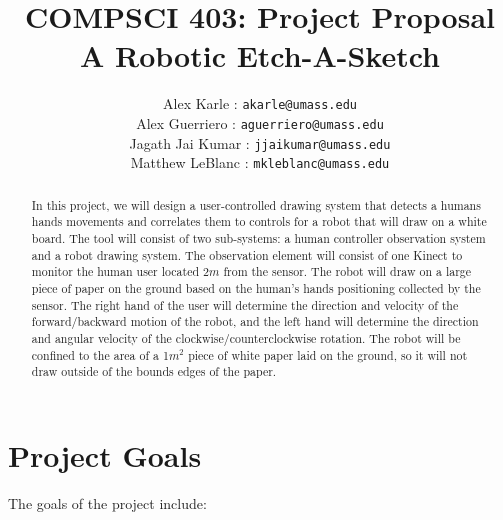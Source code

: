 \documentclass[a4paper]{article}
\title{
COMPSCI 403: Project Proposal \\ 
A Robotic Etch-A-Sketch
}
\author{
Alex Karle : \texttt{akarle@umass.edu}  \\ 
Alex Guerriero : \texttt{aguerriero@umass.edu}  \\ 
Jagath Jai Kumar : \texttt{jjaikumar@umass.edu} \\ 
Matthew LeBlanc : \texttt{mkleblanc@umass.edu}
}
\begin{document}
\maketitle

\begin{abstract}
In this project, we will design a user-controlled drawing system that detects a humans hands movements and correlates them to controls for a robot that will draw on a white board. The tool will consist of two sub-systems: a human controller observation system and a robot drawing system. The observation element will consist of one Kinect to monitor the human user located 2$m$ from the sensor. The robot will draw on a large piece of paper on the ground based on the human's hands positioning collected by the sensor. The right hand of the user will determine the direction and velocity of the forward/backward motion of the robot, and the left hand will determine the direction and angular velocity of the clockwise/counterclockwise rotation. The robot will be confined to the area of a 1$m^2$ piece of white paper laid on the ground, so it will not draw outside of the bounds edges of the paper.
\end{abstract}

\section{Project Goals}

The goals of the project include:
\end{document}
